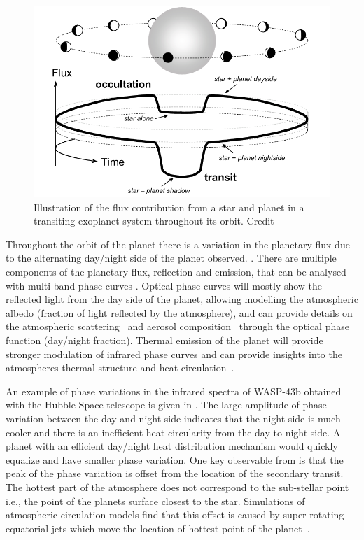 \begin{figure}
    \centering
    \includegraphics[width=0.6\linewidth]{./figures/introduction/circular_diagram.png}
    \caption{Illustration of the flux contribution from a star and planet in a transiting exoplanet system throughout its orbit. Credit~\citet{winn_transits_2010}}
    \label{fig:transits_and_occultations}
\end{figure}

Throughout the orbit of the planet there is a variation in the planetary flux due to the alternating day/night side of the planet observed. .
There are multiple components of the planetary flux, reflection and emission,  that can be analysed with multi-band phase curves \citep[e.g.][]{knutson_characterizing_2009, esteves_optical_2013}. Optical phase curves will mostly show the reflected light from the day side of the planet, allowing modelling the atmospheric albedo (fraction of light reflected by the atmosphere), and can provide details on the atmospheric scattering~\citep{madhusudhan_analytic_2012} and aerosol composition~\citep{oreshenko_optical_2016} through the optical phase function (day/night fraction). Thermal emission of the planet will provide stronger modulation of infrared phase curves and can provide insights into the atmospheres thermal
structure and heat circulation~\citep{ goodman_thermodynamics_2009, koll_temperature_2016}.


An example of phase variations in the infrared spectra of {WASP-43b} obtained with the Hubble Space telescope is given in . The large amplitude of phase variation between the day and night side indicates that the night side is much cooler and there is an inefficient heat circularity from the day to night side. A planet with an efficient day/night heat distribution mechanism would quickly equalize and have smaller phase variation. One key observable from  is that the peak of the phase variation is offset from the location of the secondary transit. The hottest part of the atmosphere does not correspond to the sub-stellar point i.e., the point of the planets surface closest to the star. Simulations of atmospheric circulation models find that this offset is caused by super-rotating equatorial jets which move the location of hottest point of the planet~\citep[e.g.][and references therein]{heng_atmospheric_2015}. 

